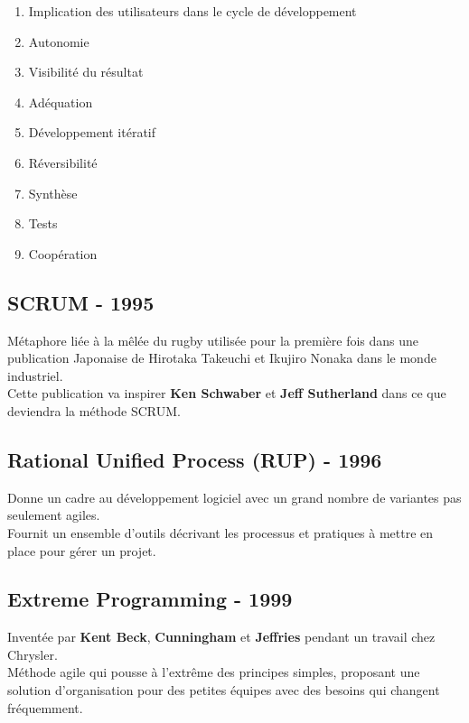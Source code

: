 \documentclass{report}
\begin{document}
			\begin{enumerate}
				\item Implication des utilisateurs dans le cycle de développement
				\item Autonomie
				\item Visibilité du résultat
				\item Adéquation
				\item Développement itératif
				\item Réversibilité
				\item Synthèse
				\item Tests
				\item Coopération
			\end{enumerate}

		\subsection{SCRUM - 1995}

			Métaphore liée à la mêlée du rugby utilisée pour la première fois dans une publication Japonaise de Hirotaka Takeuchi et Ikujiro Nonaka dans le monde industriel.\\

			Cette publication va inspirer \textbf{Ken Schwaber} et \textbf{Jeff Sutherland} dans ce que deviendra la méthode SCRUM.\\

		\subsection{Rational Unified Process (RUP) - 1996}

			Donne un cadre au développement logiciel avec un grand nombre de variantes pas seulement agiles.\\

			Fournit un ensemble d'outils décrivant les processus et pratiques à mettre en place pour gérer un projet.\\

		\subsection{Extreme Programming - 1999}

			Inventée par \textbf{Kent Beck}, \textbf{Cunningham} et \textbf{Jeffries} pendant un travail chez Chrysler.\\

			Méthode agile qui pousse à l'extrême des principes simples, proposant une solution d'organisation pour des petites équipes avec des besoins qui changent fréquemment.\\
\end{document}
